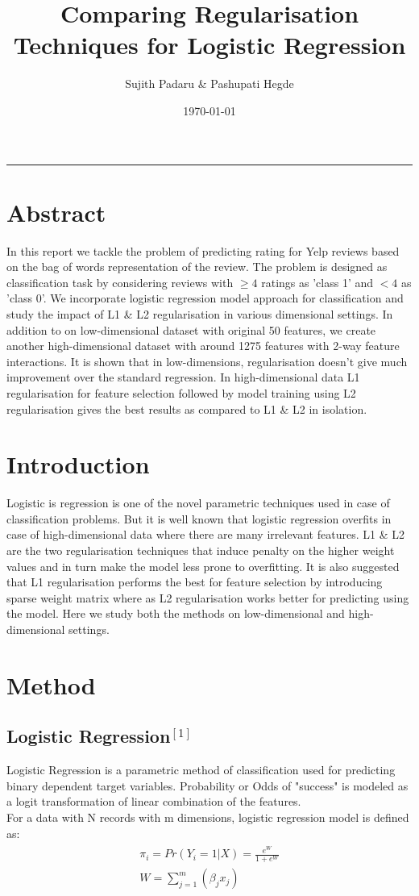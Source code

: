 \documentclass[paper=a4,fontsize=12pt]{article}
\title{Comparing Regularisation Techniques for Logistic Regression}
\author{Sujith Padaru \& Pashupati Hegde}
\date{\today}
\begin{document}
\maketitle
\rule{\linewidth}{0.5pt}

\section{Abstract}
In this report we tackle the problem of predicting rating for Yelp reviews based on the bag of words representation of the review. The problem is designed as classification task by considering reviews with $\geq 4$ ratings as 'class 1' and $< 4$ as 'class 0'. We incorporate logistic regression model approach for classification and study the impact of L1 \& L2 regularisation in various dimensional settings. In addition to on low-dimensional dataset with original 50 features, we create another high-dimensional dataset with around 1275 features with 2-way feature interactions. It is shown that in low-dimensions, regularisation doesn't give much improvement over the standard regression. In high-dimensional data L1 regularisation for feature selection followed by model training using L2 regularisation gives the best results as compared to L1 \& L2 in isolation.


\section{Introduction}
Logistic is regression is one of the novel parametric techniques used in case of classification problems. But it is well known that logistic regression overfits in case of high-dimensional data where there are many irrelevant features. L1 \& L2 are the two regularisation techniques that induce penalty on the higher weight values and in turn make the model less prone to overfitting. It is also suggested that L1 regularisation performs the best for feature selection by introducing sparse weight matrix where as L2 regularisation works better for predicting using the model. Here we study both the methods on low-dimensional and high-dimensional settings.



\section{Method}
\subsection{Logistic Regression$^{[1]}$}
Logistic Regression is a parametric method of classification used for predicting binary dependent target variables. Probability or Odds of "success" is modeled as a logit transformation of linear combination of the features.\\
For a data with N records with m dimensions, logistic regression model is defined as:
\begin{align*}
\begin{split}
\pi_i = Pr(Y_i=1|X) = \frac{e^W}{1+e^W}\\
W = \sum_{j=1}^{m} (\beta_j x_j)
\end{split}
\end{align*}
\end{document}

